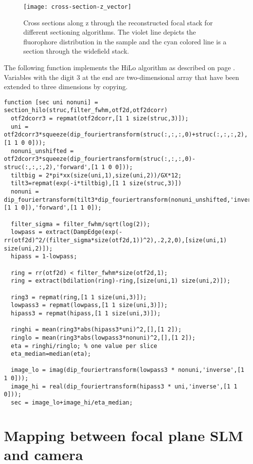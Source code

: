 \begin{figure}[htbp]
  \centering
  \texttt{[image: cross-section-z\_vector]}
  \caption{Cross sections along z through the reconstructed focal
    stack for different sectioning algorithms. The violet line depicts
    the fluorophore distribution in the sample and the cyan colored
    line is a section through the widefield stack.}
  \label{fig:cross-section-z}
\end{figure}
The following function implements the HiLo algorithm as described on
page \pageref{fig:hilo-method-description}. Variables with the digit 3
at the end are two-dimensional array that have been extended to three
dimensions by copying.
\begin{lstlisting}[style=mymatlab]
function [sec uni nonuni] = section_hilo(struc,filter_fwhm,otf2d,otf2dcorr)
  otf2dcorr3 = repmat(otf2dcorr,[1 1 size(struc,3)]);
  uni = otf2dcorr3*squeeze(dip_fouriertransform(struc(:,:,:,0)+struc(:,:,:,2),'forward',[1 1 0 0]));
  nonuni_unshifted = otf2dcorr3*squeeze(dip_fouriertransform(struc(:,:,:,0)-struc(:,:,:,2),'forward',[1 1 0 0]));
  tiltbig = 2*pi*xx(size(uni,1),size(uni,2))/GX*12;
  tilt3=repmat(exp(-i*tiltbig),[1 1 size(struc,3)])
  nonuni = dip_fouriertransform(tilt3*dip_fouriertransform(nonuni_unshifted,'inverse',[1 1 0]),'forward',[1 1 0]);

  filter_sigma = filter_fwhm/sqrt(log(2));
  lowpass = extract(DampEdge(exp(-rr(otf2d)^2/(filter_sigma*size(otf2d,1))^2),.2,2,0),[size(uni,1) size(uni,2)]);
  hipass = 1-lowpass;

  ring = rr(otf2d) < filter_fwhm*size(otf2d,1);
  ring = extract(bdilation(ring)-ring,[size(uni,1) size(uni,2)]);

  ring3 = repmat(ring,[1 1 size(uni,3)]);
  lowpass3 = repmat(lowpass,[1 1 size(uni,3)]);
  hipass3 = repmat(hipass,[1 1 size(uni,3)]);

  ringhi = mean(ring3*abs(hipass3*uni)^2,[],[1 2]);
  ringlo = mean(ring3*abs(lowpass3*nonuni)^2,[],[1 2]);
  eta = ringhi/ringlo; % one value per slice
  eta_median=median(eta);
      
  image_lo = imag(dip_fouriertransform(lowpass3 * nonuni,'inverse',[1 1 0]));
  image_hi = real(dip_fouriertransform(hipass3 * uni,'inverse',[1 1 0]));
  sec = image_lo+image_hi/eta_median;
\end{lstlisting}
\chapter{Mapping between focal plane SLM and camera}
\label{sec:app_map}
